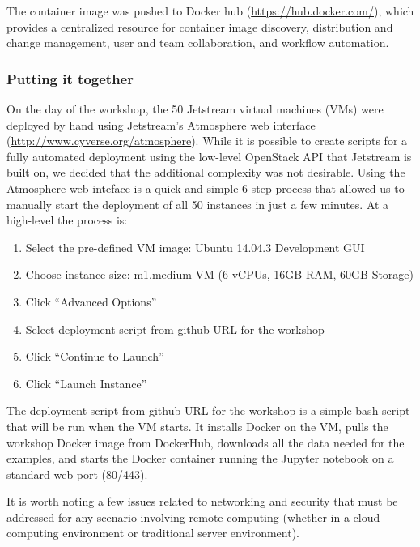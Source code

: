 The container image was pushed to Docker hub (\url{https://hub.docker.com/}),
which provides a centralized resource for container image discovery,
distribution and change management, user and team collaboration, and workflow
automation.

\subsubsection{Putting it together}

 

On the day of the workshop, the 50 Jetstream virtual machines (VMs) were
deployed by hand using Jetstream’s Atmosphere web interface
(\url{http://www.cyverse.org/atmosphere}). While it is possible to create
scripts for a fully automated deployment using the low-level OpenStack API that
Jetstream is built on, we decided that the additional complexity was not
desirable. Using the Atmosphere web inteface is a quick and simple 6-step
process that allowed us to manually start the deployment of all 50 instances in
just a few minutes. At a high-level the process is:

\begin{enumerate}
\item Select the pre-defined VM image: Ubuntu 14.04.3 Development GUI
\item Choose instance size: m1.medium VM (6 vCPUs, 16GB RAM, 60GB
  Storage)
\item Click “Advanced Options”
\item Select deployment script from github URL for the workshop
\item Click “Continue to Launch”
\item Click “Launch Instance”
\end{enumerate}

The deployment script from github URL for the workshop is a simple bash script
that will be run when the VM starts. It installs Docker on the VM, pulls the
workshop Docker image from DockerHub, downloads all the data needed for the
examples, and starts the Docker container running the Jupyter notebook on a
standard web port (80/443).

It is worth noting a few issues related to networking and security that must be
addressed for any scenario involving remote computing (whether in a cloud
computing environment or traditional server environment).

